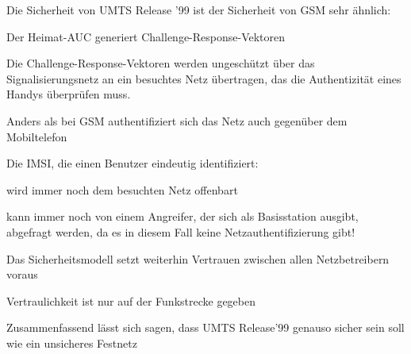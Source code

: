 \documentclass[a4paper]{article}
\begin{document}
\begin{multicols}{3}
      \begin{itemize*}
            \item Die Sicherheit von UMTS Release '99 ist der Sicherheit von GSM sehr
            ähnlich:
            \begin{itemize*}
                  \item Der Heimat-AUC generiert Challenge-Response-Vektoren
                  \item Die Challenge-Response-Vektoren werden ungeschützt über das Signalisierungsnetz an ein besuchtes Netz übertragen, das die Authentizität eines Handys überprüfen muss.
                  \item Anders als bei GSM authentifiziert sich das Netz auch gegenüber dem Mobiltelefon
                  \item Die IMSI, die einen Benutzer eindeutig identifiziert:
                  \begin{itemize*} 
                        \item wird immer noch dem besuchten Netz offenbart 
                        \item kann immer noch von einem Angreifer, der sich als Basisstation ausgibt, abgefragt werden, da es in diesem Fall keine Netzauthentifizierung gibt! 
                  \end{itemize*}
                  \item Das Sicherheitsmodell setzt weiterhin Vertrauen zwischen allen Netzbetreibern voraus
                  \item Vertraulichkeit ist nur auf der Funkstrecke gegeben
            \end{itemize*}
            \item Zusammenfassend lässt sich sagen, dass UMTS Release'99 genauso sicher
            sein soll wie ein unsicheres Festnetz
      \end{itemize*}



\end{multicols}
\end{document}
